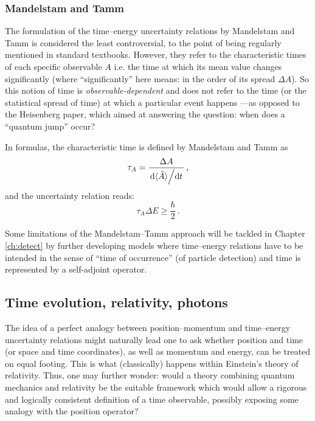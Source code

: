 \subsubsection{Mandelstam and Tamm}

The formulation of the time--energy uncertainty relations by Mandelstam and Tamm
\parencite{MandelstamTamm} is considered the least controversial, to the point
of being regularly mentioned in standard textbooks. However,
they refer to the characteristic times of each specific observable $A$ i.e.
the time at which its mean value changes significantly (where ``significantly''
here means: in the order of its spread $\Delta{A}$). So this notion of time
is \emph{observable-dependent} and does not refer to the time (or the statistical spread of time)
at which a particular event happens
---as opposed to the Heisenberg paper, which aimed at answering the question: when does
a ``quantum jump'' occur?

In formulas, the characteristic time is defined by Mandelstam and Tamm as
\begin{equation}
  \tau_{A} = \frac{ \Delta{A} } { \dv*{\langle\hat{A}\rangle}{t} } \, \text{,}
\end{equation}
and the uncertainty relation reads:
\begin{equation}
  \tau_{A}\Delta{E} \ge \frac{\hbar}{2} \, \text{.}
\end{equation}

Some limitations of the Mandelstam--Tamm
approach
will be tackled
in
Chapter \ref{ch:detect}
by further developing
models where time--energy relations have to be intended in the sense
of ``time of occurrence'' (of particle detection)
and time is represented
by a self-adjoint operator.

% 

\subsection{Time evolution, relativity, photons}\label{sec:trel}

The idea of a perfect analogy between
position--momentum and time--energy uncertainty relations 
might naturally lead one to ask whether position and time
(or space and time coordinates), as well as momentum and energy, can be treated on
equal footing. This is what (classically) happens within Einstein's theory of relativity.
Thus, one may further wonder:
would a theory combining quantum mechanics and
relativity be the suitable framework which would allow a rigorous and logically consistent
definition of a time observable,
possibly exposing some analogy with the position operator?


